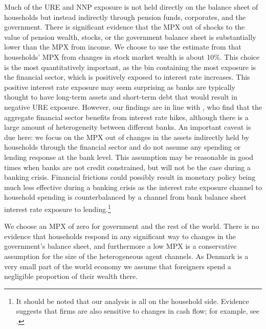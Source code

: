 \documentclass[titlepage]{\econtex}\newcommand{\texname}{ConsumptionHeterogeneity}
\begin{document}
Much of the URE and NNP exposure is not held directly on the balance sheet of households but instead indirectly through pension funds, corporates, and the government. There is significant evidence that the MPX out of shocks to the value of pension wealth, stocks, or the government balance sheet is substantially lower than the MPX from income. We choose to use the estimate from \cite{maggio_stock_2018} that households' MPX from changes in stock market wealth is about 10\%. This choice is the most quantitatively important, as the bin containing the most exposure is the financial sector, which is positively exposed to interest rate increases. This positive interest rate exposure may seem surprising as banks are typically thought to have long-term assets and short-term debt that would result in negative URE exposure. However, our findings are in line with \cite{landier_banks_2013}, who find that the aggregate financial sector benefits from interest rate hikes, although there is a large amount of heterogeneity between different banks. An important caveat is due here: we focus on the MPX out of changes in the assets indirectly held by households through the financial sector and do not assume any spending or lending response at the bank level. This assumption may be reasonable in good times when banks are not credit constrained, but will not be the case during a banking crisis. Financial frictions could possibly result in monetary policy being much less effective during a banking crisis as the interest rate exposure channel to household spending is counterbalanced by a channel from bank balance sheet interest rate exposure to lending.\footnote{It should be noted that our analysis is all on the household side. Evidence suggests that firms are also sensitive to changes in cash flow; for example, see \cite{blanchard_what_1994}.} 

We choose an MPX of zero for government and the rest of the world. There is no evidence that households respond in any significant way to changes in the government's balance sheet, and furthermore a low MPX is a conservative assumption for the size of the heterogeneous agent channels. As Denmark is a very small part of the world economy we assume that foreigners spend a negligible proportion of their wealth there.
\begin{center}
	\label{table:aggElas}
	
\end{center}
\end{document}
